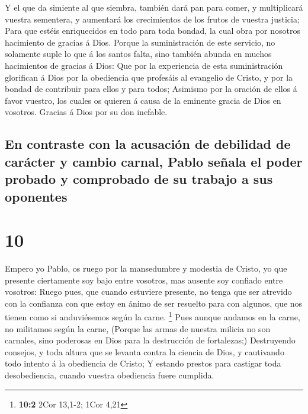  Y el que da simiente al que siembra, también dará pan
para comer, y multiplicará vuestra sementera, y aumentará los
crecimientos de los frutos de vuestra justicia;  Para que
estéis enriquecidos en todo para toda bondad, la cual obra por nosotros
hacimiento de gracias á Dios.  Porque la suministración
de este servicio, no solamente suple lo que á los santos falta, sino
también abunda en muchos hacimientos de gracias á Dios: 
Que por la experiencia de esta suministración glorifican á Dios por la
obediencia que profesáis al evangelio de Cristo, y por la bondad de
contribuir para ellos y para todos;  Asimismo por la
oración de ellos á favor vuestro, los cuales os quieren á causa de la
eminente gracia de Dios en vosotros.  Gracias á Dios por
su don inefable.

\hypertarget{en-contraste-con-la-acusaciuxf3n-de-debilidad-de-caruxe1cter-y-cambio-carnal-pablo-seuxf1ala-el-poder-probado-y-comprobado-de-su-trabajo-a-sus-oponentes}{%
\subsection{En contraste con la acusación de debilidad de carácter y
cambio carnal, Pablo señala el poder probado y comprobado de su trabajo
a sus
oponentes}\label{en-contraste-con-la-acusaciuxf3n-de-debilidad-de-caruxe1cter-y-cambio-carnal-pablo-seuxf1ala-el-poder-probado-y-comprobado-de-su-trabajo-a-sus-oponentes}}

\hypertarget{section-9}{%
\section{10}\label{section-9}}

 Empero yo Pablo, os ruego por la mansedumbre y modestia
de Cristo, yo que presente ciertamente soy bajo entre vosotros, mas
ausente soy confiado entre vosotros:  Ruego pues, que
cuando estuviere presente, no tenga que ser atrevido con la confianza
con que estoy en ánimo de ser resuelto para con algunos, que nos tienen
como si anduviésemos según la carne. \footnote{\textbf{10:2} 2Cor
  13,1-2; 1Cor 4,21}  Pues aunque andamos en la carne, no
militamos según la carne,  (Porque las armas de nuestra
milicia no son carnales, sino poderosas en Dios para la destrucción de
fortalezas;)  Destruyendo consejos, y toda altura que se
levanta contra la ciencia de Dios, y cautivando todo intento á la
obediencia de Cristo;  Y estando prestos para castigar
toda desobediencia, cuando vuestra obediencia fuere cumplida.

